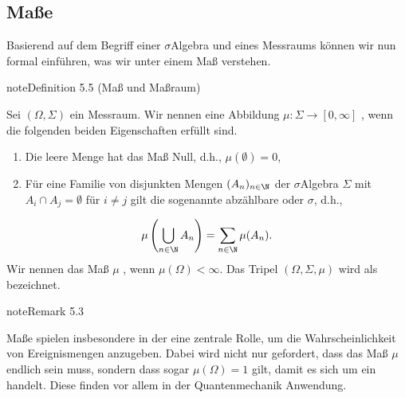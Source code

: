 \documentclass[letterpaper,10pt,german]{jupyterBook}
\begin{document}
\subsection{Maße}
\label{\detokenize{masstheorie/masstheorie:masze}}
\sphinxAtStartPar
Basierend auf dem Begriff einer \(\sigma\)\sphinxhyphen{}Algebra und eines Messraums können wir nun formal einführen, was wir unter einem Maß verstehen.
\label{masstheorie/masstheorie:def:mass}
\begin{sphinxadmonition}{note}{Definition 5.5 (Maß und Maßraum)}



\sphinxAtStartPar
Sei \((\Omega, \Sigma)\) ein Messraum.
Wir nennen eine Abbildung \(\mu: \Sigma\to [0, \infty]\) , wenn die folgenden beiden Eigenschaften erfüllt sind.
\begin{enumerate}
%
\item {} 
\sphinxAtStartPar
Die leere Menge hat das Maß Null, d.h., \(\mu(\emptyset) = 0\),

\item {} 
\sphinxAtStartPar
Für eine Familie von disjunkten Mengen \((A_n)_{n\in\N}\) der \(\sigma\)\sphinxhyphen{}Algebra \(\Sigma\) mit \(A_i \cap A_j = \emptyset\) für \(i \neq j\) gilt die sogenannte abzählbare oder \(\sigma\)\sphinxhyphen{}, d.h.,

\end{enumerate}
\begin{equation*}
\begin{split}\mu\left( \bigcup_{n\in\N}A_n \right) = \sum_{n\in\N}\mu (A_n).\end{split}
\end{equation*}
\sphinxAtStartPar
Wir nennen das Maß \(\mu\) , wenn \(\mu(\Omega)<\infty\).
Das Tripel \((\Omega, \Sigma, \mu)\) wird als  bezeichnet.
\end{sphinxadmonition}
\label{masstheorie/masstheorie:rem:wahrscheinlichkeitsmass}
\begin{sphinxadmonition}{note}{Remark 5.3}



\sphinxAtStartPar
Maße spielen insbesondere in der  eine zentrale Rolle, um die Wahrscheinlichkeit von Ereignismengen anzugeben.
Dabei wird nicht nur gefordert, dass das Maß \(\mu\) endlich sein muss, sondern dass sogar \(\mu(\Omega)=1\) gilt, damit es sich um ein  handelt.
Diese finden vor allem in der Quantenmechanik Anwendung.
\end{sphinxadmonition}
\end{document}
